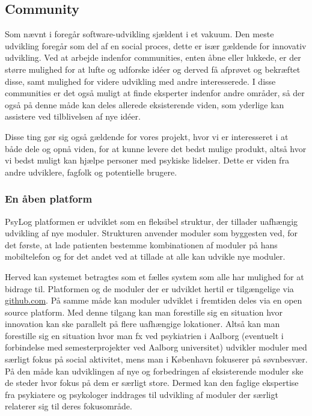 \subsection{Community}
Som nævnt i \citet[Kapitel 2]{book:softwareinnovation} foregår software-udvikling sjældent i et vakuum.
Den meste udvikling foregår som del af en social proces, dette er især gældende for innovativ udvikling.
Ved at arbejde indenfor communities, enten åbne eller lukkede, er der større mulighed for at lufte og udforske idéer og derved få afprøvet og bekræftet disse, samt mulighed for videre udvikling med andre interesserede.
I disse communities er det også muligt at finde eksperter indenfor andre områder, så der også på denne måde kan deles allerede eksisterende viden, som yderlige kan assistere ved tilblivelsen af nye idéer.

Disse ting gør sig også gældende for vores projekt, hvor vi er interesseret i at både dele og opnå viden, for at kunne levere det bedst mulige produkt, altså hvor vi bedst muligt kan hjælpe personer med psykiske lidelser.
Dette er viden fra andre udviklere, fagfolk og potentielle brugere.

\subsubsection{En åben platform}
PsyLog platformen er udviklet som en fleksibel struktur, der tillader uafhængig udvikling af nye moduler.
Strukturen anvender moduler som byggesten ved, for det første, at lade patienten bestemme kombinationen af moduler på hans mobiltelefon og for det andet ved at tillade at alle kan udvikle nye moduler.

Herved kan systemet betragtes som et fælles system som alle har mulighed for at bidrage til.
Platformen og de moduler der er udviklet hertil er tilgængelige via \href{http://github.com}{github.com}.
På samme måde kan moduler udviklet i fremtiden deles via en open source platform.
Med denne tilgang kan man forestille sig en situation hvor innovation kan ske parallelt på flere uafhængige lokationer.
Altså kan man forestille sig en situation hvor man fx ved psykiatrien i Aalborg (eventuelt i forbindelse med semesterprojekter ved Aalborg universitet) udvikler moduler med særligt fokus på social aktivitet, mens man i København fokuserer på søvnbesvær.
På den måde kan udviklingen af nye og forbedringen af eksisterende moduler ske de steder hvor fokus på dem er særligt store.
Dermed kan den faglige ekspertise fra psykiatere og psykologer inddrages til udvikling af moduler der særligt relaterer sig til deres fokusområde.

